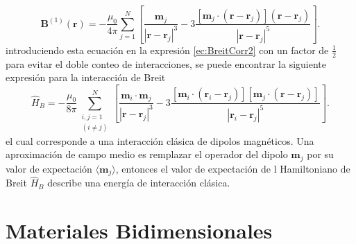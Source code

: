 \documentclass[12pt,a4paper, oneside]{book}
\begin{document}
    \begin{equation}
    \pmb{B}^{(1)} (\pmb{r}) = - \frac{\mu_0}{4 \pi } \sum_{j=1}^N \left[ \frac{\pmb{m}_j}{|\pmb{r}-\pmb{r}_j|^3} - 3 \frac{[\pmb{m}_j \cdot (\pmb{r}-\pmb{r}_j)](\pmb{r}-\pmb{r}_j)}{|\pmb{r}-\pmb{r}_j|^5} \right]. \label{ec:B1}
    \end{equation} 
    introduciendo esta ecuaci\'on en la expresi\'on \ref{ec:BreitCorr2} con un factor de $\frac{1}{2}$ para evitar el doble conteo de interacciones, se puede encontrar la siguiente expresi\'on para la interacci\'on de Breit
    \begin{equation}
    \hat{H}_B = - \frac{\mu_0}{8 \pi } \sum_{\substack{i,j = 1 \\ (i \not = j)}}^N \left[ \frac{\pmb{m}_i \cdot \pmb{m}_j}{|\pmb{r}-\pmb{r}_j|^3} - 3 \frac{[\pmb{m}_i \cdot (\pmb{r}_i-\pmb{r}_j)][\pmb{m}_j \cdot (\pmb{r}-\pmb{r}_j)]}{|\pmb{r}_i-\pmb{r}_j|^5} \right]. \label{ec:BreitCorr3}
    \end{equation}
    el cual corresponde a una interacci\'on cl\'asica de dipolos magn\'eticos. Una aproximaci\'on de campo medio es remplazar el operador del dipolo $\pmb{m}_j$ por su valor de expectaci\'on $\langle \pmb{m}_j \rangle$, entonces el valor de expectaci\'on de l Hamiltoniano de Breit $\hat{H}_B$ describe una energ\'ia de interacci\'on cl\'asica. 
     
    \chapter{Materiales Bidimensionales}
    
    
\end{document}
